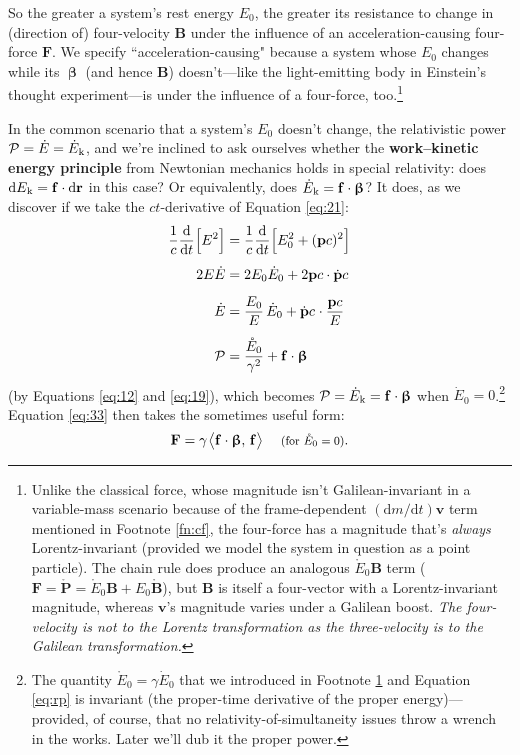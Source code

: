 \documentclass[12pt]{article}
\renewcommand{\vv}[1]{\mathbf{#1}}
\newcommand{\dd}[1]{\mathrm{d}#1}
\newcommand{\vvbeta}{\bm{\upbeta}}
\begin{document}
So the greater a system's rest energy $E_0$, the greater its resistance to change in (direction of) four-velocity $\vv B$ under the influence of an acceleration-causing four-force $\vv F$. We specify ``acceleration-causing" because a system whose $E_0$ changes while its $\vvbeta$ (and hence $\vv B$) doesn't---like the light-emitting body in Einstein's thought experiment---is under the influence of a four-force, too.\footnote{\label{fn:fo}Unlike the classical force, whose magnitude isn't Galilean-invariant in a variable-mass scenario because of the frame-dependent $(\dd m / \dd t) \vv v$ term mentioned in Footnote \ref{fn:cf}, the four-force has a magnitude that's \emph{always} Lorentz-invariant (provided we model the system in question as a point particle). The chain rule does produce an analogous $\mathring{E}_0 \vv B$ term ($\vv F = \mathring{\vv P} = \mathring{E}_0 \vv B + E_0 \mathring{\vv B}$), but $\vv B$ is itself a four-vector with a Lorentz-invariant magnitude, whereas $\vv v$'s magnitude varies under a Galilean boost. \emph{The four-velocity is \emph{not} to the Lorentz transformation as the three-velocity is to the Galilean transformation.}}

In the common scenario that a system's $E_0$ doesn't change, the relativistic power $\mathcal{P} = \dot{E} = \dot{E}_{\mkern.5mu \textrm{k}}$, and we're inclined to ask ourselves whether the \textbf{work--kinetic energy principle} from Newtonian mechanics holds in special relativity: does $\dd E_{\mkern.5mu \textrm{k}} = \vv f \cdot \dd \vv r$ in this case? Or equivalently, does $\dot{E}_{\mkern.5mu \textrm{k}} = \vv f \cdot \vvbeta$? It does, as we discover if we take the $ct$-derivative of Equation \ref{eq:21}:
\begin{equation}\label{eq:rp}
\begin{split}
\frac{1}{c} \frac{\dd}{\dd t} \Big[ E^2 \Big] &= \frac{1}{c} \frac{\dd}{\dd t} \Big[ E_0^2 + (\vv p c)^2 \Big] \\[5pt]
2E \dot{E} &= 2 E_0 \dot{E}_0 + 2 \vv p c \cdot \dot{\vv p} c\\[5pt]
\dot{E} &= \dfrac{E_0}{E} \, \dot{E}_0 + \dot{\vv p} c \mkern1mu \cdot \dfrac{\vv p c}{E} \\[5pt]
\mathcal{P} &= \dfrac{\mathring{E}_0}{\gamma^2} + \vv f \cdot \vvbeta
\end{split}
\end{equation}
(by Equations \ref{eq:12} and \ref{eq:19}), which becomes $\mathcal{P} = \dot{E}_{\mkern.5mu \textrm{k}} = \vv f \cdot \vvbeta$ when $\dot{E}_0 = 0$.\footnote{The quantity $\mathring{E}_0 = \gamma \dot{E}_0$ that we introduced in Footnote \ref{fn:fo} and Equation \ref{eq:rp} is invariant (the proper-time derivative of the proper energy)---provided, of course, that no relativity-of-simultaneity issues throw a wrench in the works. Later we'll dub it the proper power.} Equation \ref{eq:33} then takes the sometimes useful form:
\begin{equation}\label{eq:fb}
\vv F = \gamma \mkern1.5mu \big \langle \vv f \cdot \vvbeta, \, \vv f \big \rangle \quad \textrm{\footnotesize{ (for $\mathring{E}_0 = 0$)}}.
\end{equation}
\end{document}
